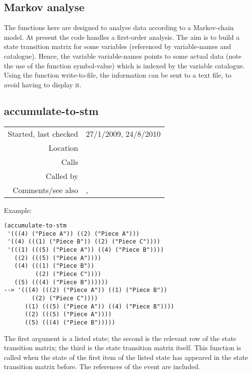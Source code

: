 \subsection{Markov analyse}\label{sec:markov-analyse}

The functions here are designed to analyse data
according to a Markov-chain model. At present the code
handles a first-order analysis. The aim is to build a
state transition matrix for some variables (referenced
by variable-names and catalogue). Hence, the variable
variable-names points to some actual data (note the
use of the function symbol-value) which is indexed by
the variable catalogue. Using the function
write-to-file, the information can be sent to a text
file, to avoid having to display it.


\subsection*{accumulate-to-stm}\label{fun:accumulate-to-stm}

\vspace{0.3cm}
\begin{tabular}{r|p{8cm}}
Started, last checked & 27/1/2009, 24/8/2010 \\
Location & \nameref{sec:markov-analyse} \\
Calls & \\
Called by & \nameref{fun:present-to-stm} \\
Comments/see also & \nameref{fun:accumulate-to-stm<-}, \nameref{fun:add-to-stm}
\end{tabular}

\vspace{0.5cm}
\noindent Example:
\begin{verbatim}
(accumulate-to-stm
 '(((4) ("Piece A")) ((2) ("Piece A")))
 '((4) (((1) ("Piece B")) ((2) ("Piece C"))))
 '(((1) (((5) ("Piece A")) ((4) ("Piece B"))))
   ((2) (((5) ("Piece A"))))
   ((4) (((1) ("Piece B"))
         ((2) ("Piece C"))))
   ((5) (((4) ("Piece B"))))))
--> '(((4) (((2) ("Piece A")) ((1) ("Piece B"))
	    ((2) ("Piece C"))))
      ((1) (((5) ("Piece A")) ((4) ("Piece B"))))
      ((2) (((5) ("Piece A"))))
      ((5) (((4) ("Piece B")))))
\end{verbatim}

\noindent The first argument is a listed state; the
second is the relevant row of the state transition
matrix; the third is the state transition matrix
itself. This function is called when the state of the
first item of the listed state has appeared in the
state transition matrix  before. The references of the
event are included.



